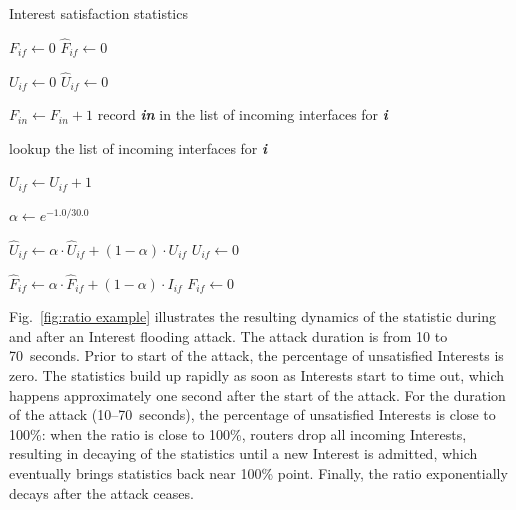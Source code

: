 \documentclass[10pt,conference]{IEEEtran}
\begin{document}
\begin{algorithm}[t]
\footnotesize
\caption{\small Interest satisfaction statistics}
\label{algo:interest stats}
\begin{algorithmic}[1]

    \State $F_{if} \leftarrow 0$ 
    \State $\hat F_{if} \leftarrow 0$ 

    \State $U_{if} \leftarrow 0$ 
    \State $\hat U_{if} \leftarrow 0$ 
\EndFor

\vspace{0.1cm}
  \State $F_{in} \leftarrow F_{in} + 1$
  \State record \textbf{\emph{in}} in the list of incoming interfaces for \textbf{\emph{i}}
\EndFunction

\vspace{0.1cm}
    \State lookup the list of incoming interfaces for \textbf{\emph{i}}

        \State $U_{if} \leftarrow U_{if} + 1$
    \EndFor
\EndFunction

\vspace{0.1cm}

\State {} 
 
\State $\alpha \leftarrow e^{-1.0/30.0}$  %

    \State $\hat U_{if} \leftarrow \alpha \cdot \hat U_{if} + (1 - \alpha) \cdot U_{if}$ 
    \State $U_{if} \leftarrow 0$ 

     
        \State $\hat F_{if} \leftarrow \alpha \cdot \hat F_{if} + (1 - \alpha) \cdot I_{if}$ 
        \State $F_{if} \leftarrow 0$ 
    \EndIf
\EndFor

\EndFunction

\end{algorithmic}
\end{algorithm}


Fig.~\ref{fig:ratio example} illustrates the resulting dynamics of the statistic during and after an Interest flooding attack. The attack duration is from 10 to 70~seconds. Prior to start of the attack, the percentage of unsatisfied Interests is zero.  
The statistics build up rapidly as soon as Interests start to time out, which happens approximately one second after the start of the attack.
For the duration of the attack (10--70~seconds), the percentage of unsatisfied Interests is close to 100\%: 
when the ratio is close to 100\%, routers drop all incoming Interests, resulting in decaying of the statistics until a new Interest is admitted, which eventually brings statistics back near 100\% point.
Finally, the ratio exponentially decays after the attack ceases.
\end{document}
